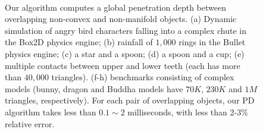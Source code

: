 \begin{figure}[!h]
{  \\
}
\caption[Learning-based PD computation algorithm computes a global penetration depth between overlapping non-convex and non-manifold objects]{Our algorithm computes a global penetration depth between overlapping non-convex and non-manifold objects. (a) Dynamic simulation of angry bird characters falling into a complex chute in the Box2D physics engine; (b) rainfall of $1,000$ rings in the Bullet physics engine; (c) a star and a spoon; (d) a spoon and a cup; (e) multiple contacts between upper and lower teeth (each has more than $40,000$ triangles). (f-h) benchmarks consisting of complex models (bunny, dragon and Buddha models have $70K$, $230K$ and $1M$ triangles, respectively). For each pair of overlapping objects, our PD algorithm takes less than $0.1\sim2$ milliseconds, with less than 2-3\% relative error.}\label{fig:2:demo}
\end{figure}



